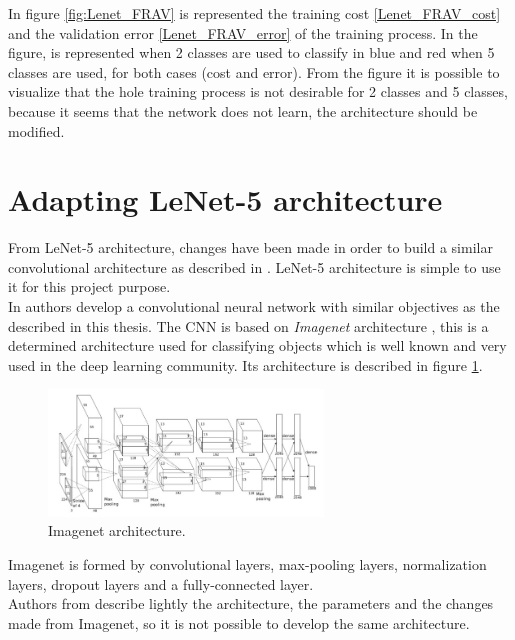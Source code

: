 In figure \ref{fig:Lenet_FRAV} is represented the training cost \ref{Lenet_FRAV_cost} and the validation error \ref{Lenet_FRAV_error} of the training process. In the figure, is represented when 2 classes are used to classify in  blue and red when 5 classes are used, for both cases (cost and error). From the figure it is possible to visualize that the hole training process is not desirable for 2 classes and 5 classes, because it seems that the network does not learn, the architecture should be modified.\\

\section{Adapting LeNet-5 architecture}
From LeNet-5 architecture, changes have been made in order to build a similar convolutional architecture as described in \cite{yangLL14}. LeNet-5 architecture is simple to use it for this project purpose.\\

In \cite{yangLL14} authors develop a convolutional neural network with similar objectives as the described in this thesis. The CNN is based on \textit{Imagenet} architecture \cite{imagenet}, this is a determined architecture used for classifying objects which is well known and very used in the deep learning community. Its architecture is described in figure \ref{fig:Imagenet_architecture}.\\

\begin{figure}[htb]
\centering
\includegraphics[width=0.65\textwidth]{images_miscelaneus/Imagenet.png}
\caption{Imagenet architecture.} \label{fig:Imagenet_architecture}
\end{figure}

Imagenet is formed by convolutional layers, max-pooling layers, normalization layers, dropout layers and a fully-connected layer.\\

Authors from \cite{yangLL14} describe lightly the architecture, the parameters and the changes made from Imagenet, so it is not possible to develop the same architecture.\\

